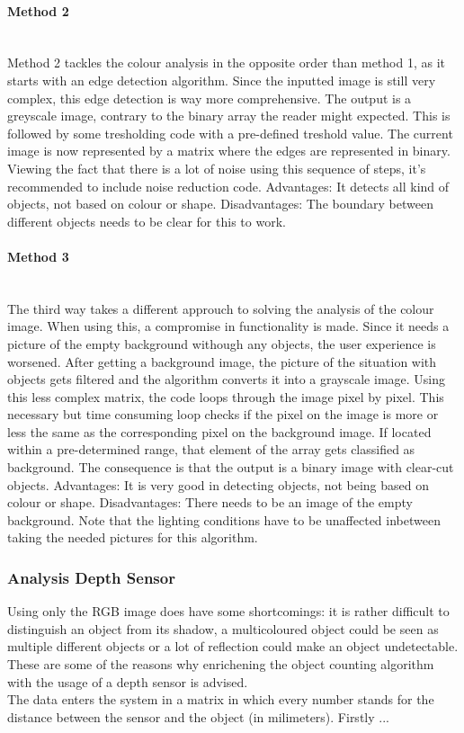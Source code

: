 \documentclass[11pt]{article}
\begin{document}
\paragraph{Method 2}\mbox{}\\
Method 2 tackles the colour analysis in the opposite order than method 1, as it starts with an edge detection algorithm. Since the inputted image is still very complex, this edge detection is way more comprehensive. The output is a greyscale image, contrary to the binary array the reader might expected. This is followed by some tresholding code with a pre-defined treshold value. The current image is now represented by a matrix where the edges are represented in binary. Viewing the fact that there is a lot of noise using this sequence of steps, it's recommended to include noise reduction code. 
Advantages: It detects all kind of objects, not based on colour or shape.
Disadvantages: The boundary between different objects needs to be clear for this to work.
\paragraph{Method 3}\mbox{}\\
The third way takes a different approuch to solving the analysis of the colour image. When using this, a compromise in functionality is made. Since it needs a picture of the empty background withough any objects, the user experience is worsened. After getting a background image, the picture of the situation with objects gets filtered and the algorithm converts it into a grayscale image. Using this less complex matrix, the code loops through the image pixel by pixel. This necessary but time consuming loop checks if the pixel on the image is more or less the same as the corresponding pixel on the background image. If located within a pre-determined range, that element of the array gets classified as background. The consequence is that the output is a binary image with clear-cut objects.
Advantages: It is very good in detecting objects, not being based on colour or shape.
Disadvantages: There needs to be an image of the empty background. Note that the lighting conditions have to be unaffected inbetween taking the needed pictures for this algorithm.


\subsubsection{Analysis Depth Sensor}
Using only the RGB image does have some shortcomings: it is rather difficult to distinguish an object from its shadow, a multicoloured object could be seen as multiple different objects or a lot of reflection could make an object undetectable. These are some of the reasons why enrichening the object counting algorithm with the usage of a depth sensor is advised.
\\
The data enters the system in a matrix in which every number stands for the distance between the sensor and the object (in milimeters). Firstly ...  
\end{document}
